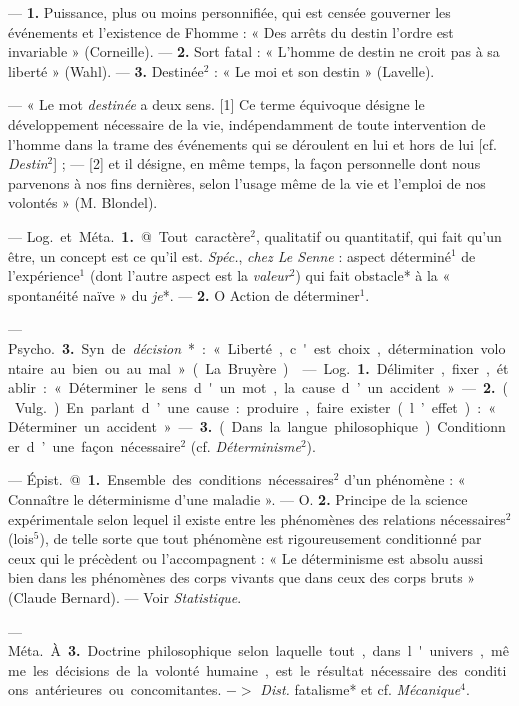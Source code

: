 \begin{itemize}[leftmargin=1cm, label=, itemsep=1pt]
 — {\bf 1.} Puissance, plus ou moins
personnifiée, qui est censée gouverner les événements et l'existence de
Fhomme : « Des arrêts du destin
l’ordre est invariable » (Corneille). —
 {\bf 2.} Sort fatal : « L'homme de destin
ne croit pas à sa liberté » (Wahl). —
 {\bf 3.} Destinée$^2$ : « Le moi et son destin »
(Lavelle).

 — « Le mot {\it destinée} a deux
sens. [1] Ce terme équivoque désigne le développement nécessaire
de la vie, indépendamment de toute
intervention de l’homme dans la
trame des événements qui se déroulent en lui et hors de lui [cf. {\it Destin}$^2$] ;
— [2] et il désigne, en même temps,
la façon personnelle dont nous parvenons à nos fins dernières, selon
l'usage même de la vie et l'emploi
de nos volontés » (M. Blondel).

 — \si{Log.} et \si{Méta.} {\bf 1.}
@ Tout caractère$^2$, qualitatif ou quantitatif, qui fait qu'un être, un concept est ce qu'il est. {\it Spéc.}, {\it chez Le
Senne} : aspect déterminé$^1$ de l’expérience$^1$ (dont l’autre aspect est la
{\it valeur}$^2$) qui fait obstacle* à la
« spontanéité naïve » du {\it je}*. —
 {\bf 2.} O Action de déterminer$^1$.

— \si{Psycho.} {\bf 3.} Syn. de {\it décision}* :
« Liberté, c'est choix, détermination volontaire au bien ou au mal »
(La Bruyère).

 — \si{Log.} {\bf 1.} Délimiter,
fixer, établir : « Déterminer le sens
d'un mot, la cause d’un accident ».
— {\bf 2.} (\si{Vulg.}). En parlant d’une
cause : produire, faire exister
(l’effet) : « Déterminer un accident ».
— {\bf 3.} (Dans la langue philosophique). Conditionner d’une façon nécessaire$^2$ (cf. {\it Déterminisme}$^2$).

 — \si{Épist.} @ {\bf 1.} Ensemble des conditions nécessaires$^2$
d’un phénomène : « Connaître le
déterminisme d’une maladie ». —
O. {\bf 2.} Principe de la science expérimentale selon lequel il existe entre
les phénomènes des relations nécessaires$^2$ (lois$^5$), de telle sorte que tout
phénomène est rigoureusement conditionné par ceux qui le précèdent
ou l’accompagnent : « Le déterminisme est absolu aussi bien dans les
phénomènes des corps vivants que
dans ceux des corps bruts » (Claude
Bernard). — Voir {\it Statistique}.

— \si{Méta.} À {\bf 3.} Doctrine philosophique selon laquelle tout, dans
l'univers, même les décisions de la
volonté humaine, est le résultat nécessaire des conditions antérieures
ou concomitantes. $->$ {\it Dist.} fatalisme* et cf. {\it Mécanique}$^4$.


\end{itemize}

